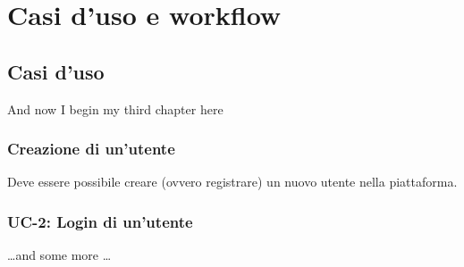 \chapter{Casi d'uso e workflow}

\section{Casi d'uso}
And now I begin my third chapter here 

\subsection{Creazione di un'utente}

Deve essere possibile creare (ovvero registrare) un nuovo utente nella piattaforma. 

\subsection{UC-2: Login di un'utente}
\dots and some more \dots
